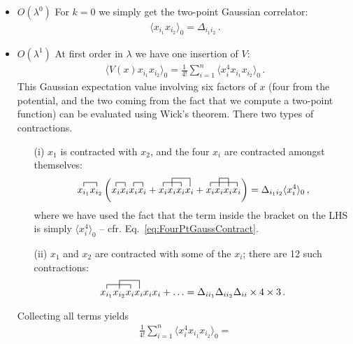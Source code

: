 \begin{itemize}
\item $O(\lambda^0)$ For $k=0$ we simply get the two-point Gaussian
  correlator: 
  \begin{align}
    \langle x_{i_1} x_{i_2} \rangle_0 = \Delta_{i_1 i_2}\, .
  \end{align}
\item $O(\lambda^1)$ At first order in $\lambda$ we have one insertion
  of $V$:
  \begin{align}
    \langle V(x) x_{i_1} x_{i_2} \rangle_0 = \frac{1}{4!} \sum_{i=1}^n
    \langle x_i^4 x_{i_1} x_{i_2} \rangle_0\, .
  \end{align}
  This Gaussian expectation value involving six factors of $x$ (four
  from the potential, and the two coming from the fact that we compute
  a two-point function) can be evaluated using Wick's
  theorem. There two types of contractions.
  \begin{itemize}
  \item [(i)] $x_1$ is contracted with $x_2$, and the four $x_i$ are
    contracted amongst themselves:
    \begin{align}
      \contraction{}{x_{i_1}}{}{x_{i_2}}
      x_{i_1} x_{i_2} 
      \left(
      \contraction{}{x_{i}}{}{x_{i}}
      \contraction{x_{i} x_{i}}{x_{i}}{}{x_{i}}
      x_{i} x_{i} x_{i} x_{i} +
      \contraction{}{x_{i}}{x_{i}}{x_{i}}
      \contraction[2ex]{x_{i}}{x_{i}}{ x_{i}}{x_{i}}
      x_{i} x_{i} x_{i} x_{i} +
      \contraction{}{x_{i}}{x_{i}x_{i}}{x_{i}}
      \contraction[2ex]{x_{i}}{x_{i}}{}{x_{i}}
      x_{i} x_{i} x_{i} x_{i} 
      \right) = \Delta_{i_1 i_2} \langle x_i^4\rangle_0
      \, ,
    \end{align}
    where we have used the fact that the term inside the bracket on
    the LHS is simply $\langle x_i^4\rangle_0$ --
    cfr. Eq.~\ref{eq:FourPtGaussContract}.
  \item [(ii)] $x_1$ and $x_2$ are contracted with some of the $x_i$;
    there are 12 such contractions:
    \begin{align}
      \contraction{}{x_{i_1}}{x_{i_2}}{x_{i}}
      \contraction[2ex]{x_{i_1}}{x_{i_2}}{x_{i}}{x_{i}}
      x_{i_1} x_{i_2}  x_{i} x_{i} x_{i} x_{i} + \ldots = 
      \Delta_{i i_1} \Delta_{i i_2} \Delta_{i i} \times 4
      \times 3\, .
    \end{align}
  \end{itemize}
  Collecting all terms yields
  \begin{align}
   \frac{1}{4!} \sum_{i=1}^n
    \langle x_i^4 x_{i_1} x_{i_2} \rangle_0 = 

\end{align}
\end{itemize}
